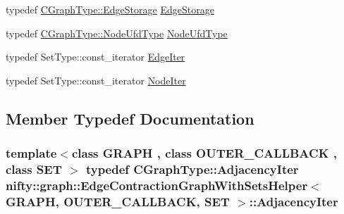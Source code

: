 \begin{DoxyCompactItemize}
\item 
typedef \hyperlink{classnifty_1_1graph_1_1EdgeContractionGraph_ad57e807f7df20892c7bbbb9b53d3aa08}{C\+Graph\+Type\+::\+Edge\+Storage} \hyperlink{structnifty_1_1graph_1_1EdgeContractionGraphWithSetsHelper_a2378dd6c8e82012a04236593971ac4e7}{Edge\+Storage}
\item 
typedef \hyperlink{classnifty_1_1graph_1_1EdgeContractionGraph_a7ff98238621f4b534e89b1880ee77239}{C\+Graph\+Type\+::\+Node\+Ufd\+Type} \hyperlink{structnifty_1_1graph_1_1EdgeContractionGraphWithSetsHelper_a254e8886638750a06342b813be34344d}{Node\+Ufd\+Type}
\item 
typedef Set\+Type\+::const\+\_\+iterator \hyperlink{structnifty_1_1graph_1_1EdgeContractionGraphWithSetsHelper_ab619625636cb861e740f216ea946fe06}{Edge\+Iter}
\item 
typedef Set\+Type\+::const\+\_\+iterator \hyperlink{structnifty_1_1graph_1_1EdgeContractionGraphWithSetsHelper_a6d07b232c0af5bf7170edb2eea02a8fb}{Node\+Iter}
\end{DoxyCompactItemize}


\subsection{Member Typedef Documentation}
\hypertarget{structnifty_1_1graph_1_1EdgeContractionGraphWithSetsHelper_a9d9969291ab3cf558c7ad2f00a2c189d}{}
\subsubsection[{Adjacency\+Iter}]{\setlength{\rightskip}{0pt plus 5cm}template$<$class G\+R\+A\+P\+H , class O\+U\+T\+E\+R\+\_\+\+C\+A\+L\+L\+B\+A\+C\+K , class S\+E\+T $>$ typedef {\bf C\+Graph\+Type\+::\+Adjacency\+Iter} {\bf nifty\+::graph\+::\+Edge\+Contraction\+Graph\+With\+Sets\+Helper}$<$ G\+R\+A\+P\+H, O\+U\+T\+E\+R\+\_\+\+C\+A\+L\+L\+B\+A\+C\+K, S\+E\+T $>$\+::{\bf Adjacency\+Iter}}\label{structnifty_1_1graph_1_1EdgeContractionGraphWithSetsHelper_a9d9969291ab3cf558c7ad2f00a2c189d}
\hypertarget{structnifty_1_1graph_1_1EdgeContractionGraphWithSetsHelper_add695ccd6756ec7e79ce2b4e6fceb5fc}{}
